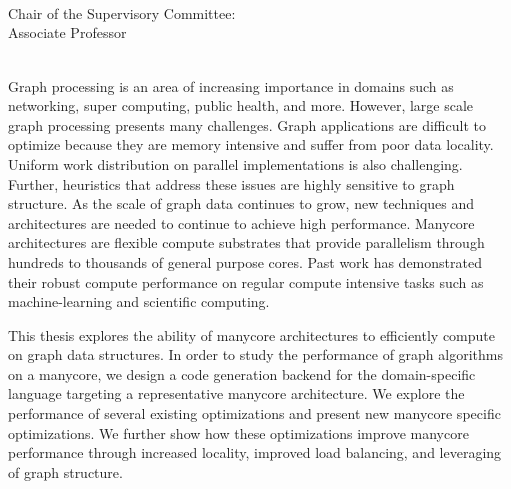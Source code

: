 \begingroup
\let\clearpage\relax
\let\cleardoublepage\relax
\let\cleardoublepage\relax

\thispagestyle{empty}
\begin{center}
     \\
    \bigskip
    {\color{CTtitle}\spacedallcaps{\myTitle} \\ \bigskip
    }
    \bigskip
    \myName \\
    \bigskip
    Chair of the Supervisory Committee: \\
    Associate Professor \myChair \\
    \myDepartment \\
    \bigskip
\end{center}




\endgroup

\vfill
Graph processing is an area of increasing importance in domains such as networking, super computing, public health, and more.
However, large scale graph processing presents many challenges.
Graph applications are difficult to optimize because they are memory intensive and suffer from poor data locality.
Uniform work distribution on parallel implementations is also challenging.
Further, heuristics that address these issues are highly sensitive to graph structure.
As the scale of graph data continues to grow, new techniques and architectures are needed to continue to achieve high performance.
Manycore architectures are flexible compute substrates that provide parallelism through hundreds to thousands of general purpose cores.
Past work has demonstrated their robust compute performance on regular compute intensive tasks such as machine-learning and scientific computing.

This thesis explores the ability of manycore architectures to efficiently compute on graph data structures.
In order to study the performance of graph algorithms on a manycore, we design a code generation backend for the \graphit domain-specific language targeting a representative manycore architecture.
We explore the performance of several existing optimizations and present new manycore specific optimizations.
We further show how these optimizations improve manycore performance through increased locality, improved load balancing, and leveraging of graph structure.
